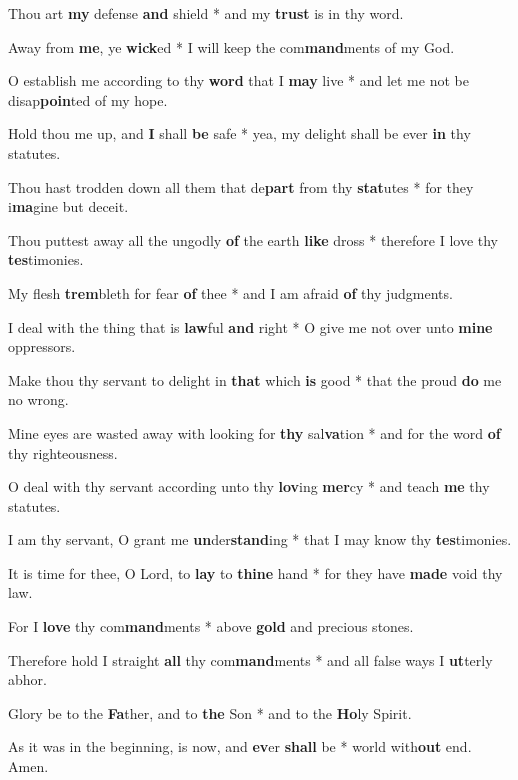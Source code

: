 \begin{multicols}{2}
	Thou art \textbf{my} defense \textbf{and} shield * and my \textbf{trust} is in thy word.
	
	Away from \textbf{me}, ye \textbf{wick}ed * I will keep the com\textbf{mand}ments of my God.
	
	O establish me according to thy \textbf{word} that I \textbf{may} live * and let me not be disap\textbf{poin}ted of my hope.
	
	Hold thou me up, and \textbf{I} shall \textbf{be} safe * yea, my delight shall be ever \textbf{in} thy statutes.
	
	Thou hast trodden down all them that de\textbf{part} from thy \textbf{stat}utes * for they i\textbf{ma}gine but deceit.
	
	Thou puttest away all the ungodly \textbf{of} the earth \textbf{like} dross * therefore I love thy \textbf{tes}timonies.
	
	My flesh \textbf{trem}bleth for fear \textbf{of} thee * and I am afraid \textbf{of} thy judgments.
	
	I deal with the thing that is \textbf{law}ful \textbf{and} right * O give me not over unto \textbf{mine} oppressors.
	
	Make thou thy servant to delight in \textbf{that} which \textbf{is} good * that the proud \textbf{do} me no wrong.
	
	Mine eyes are wasted away with looking for \textbf{thy} sal\textbf{va}tion * and for the word \textbf{of} thy righteousness.
	
	O deal with thy servant according unto thy \textbf{lov}ing \textbf{mer}cy * and teach \textbf{me} thy statutes.
	
	I am thy servant, O grant me \textbf{un}der\textbf{stand}ing * that I may know thy \textbf{tes}timonies.
	
	It is time for thee, O Lord, to \textbf{lay} to \textbf{thine} hand * for they have \textbf{made} void thy law.
	
	For I \textbf{love} thy com\textbf{mand}ments * above \textbf{gold} and precious stones.
	
	Therefore hold I straight \textbf{all} thy com\textbf{mand}ments * and all false ways I \textbf{ut}terly abhor.
	
	Glory be to the \textbf{Fa}ther, and to \textbf{the} Son * and to the \textbf{Ho}ly Spirit.
	
	As it was in the beginning, is now, and \textbf{ev}er \textbf{shall} be * world with\textbf{out} end. Amen.
\end{multicols}